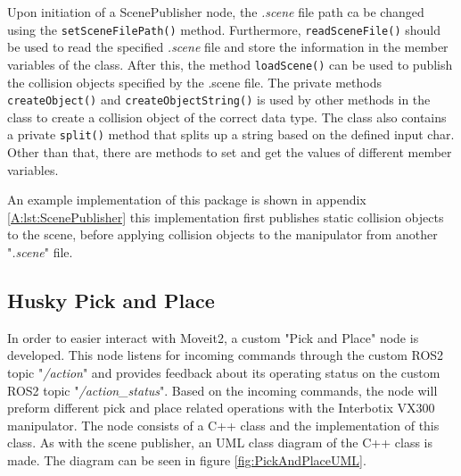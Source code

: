 Upon initiation of a ScenePublisher node, the \textit{.scene} file path ca be changed using the \lstinline{setSceneFilePath()} method. Furthermore, \lstinline{readSceneFile()} should be used to read the specified \textit{.scene} file and store the information in the member variables of the class. After this, the method \lstinline{loadScene()} can be used to publish the collision objects specified by the .scene file. The private methods \lstinline{createObject()} and \lstinline{createObjectString()} is used by other methods in the class to create a collision object of the correct data type. The class also contains a private \lstinline{split()} method that splits up a string based on the defined input char. Other than that, there are methods to set and get the values of different member variables.

An example implementation of this package is shown in appendix \ref{A:lst:ScenePublisher} this implementation first publishes static collision objects to the scene, before applying collision objects to the manipulator from another "\textit{.scene}" file. 


\subsection{Husky Pick and Place} \label{sec:M:A:HuskyPickAndPlace}
In order to easier interact with Moveit2, a custom "Pick and Place" node is developed. This node listens for incoming commands through the custom ROS2 topic "\textit{/action}" and provides feedback about its operating status on the custom ROS2 topic "\textit{/action\_status}". Based on the incoming commands, the node will preform different pick and place related operations with the Interbotix VX300 manipulator. The node consists of a C++ class and the implementation of this class. As with the scene publisher, an UML class diagram of the C++ class is made. The diagram can be seen in figure \ref{fig:PickAndPlaceUML}.


